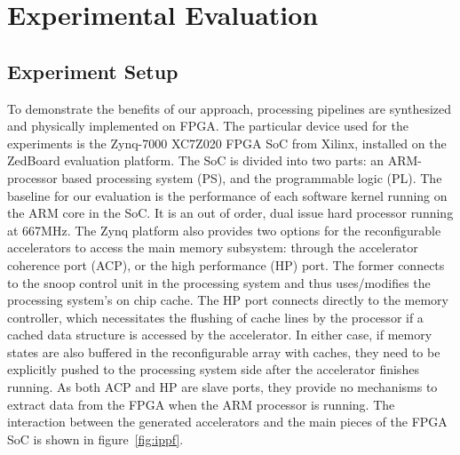 \section{Experimental Evaluation}
\label{sec:er}
\subsection{Experiment Setup }
To demonstrate the benefits of our approach, processing pipelines
are synthesized and physically implemented on FPGA. The particular device used for the experiments is the Zynq-7000 XC7Z020 FPGA
SoC from Xilinx, installed on the ZedBoard evaluation platform. 
The SoC is divided into two parts: an ARM-processor based processing system (PS), and the programmable logic (PL). 
The baseline 
for our evaluation is the performance of each software kernel running
on the ARM core in the SoC. It is an out of order, dual issue hard
processor running at 667MHz. The Zynq platform also provides two
options for the reconfigurable accelerators to access the main memory subsystem: 
through the accelerator coherence port (ACP), or the high performance (HP) port. 
The former connects to the snoop control unit in the processing system and 
thus uses/modifies the processing system's on chip cache. The HP port connects
directly to the memory controller, which necessitates the flushing of cache lines 
by the processor if a cached data structure is accessed by the accelerator.
In either case, if memory states are also buffered in the reconfigurable array with caches, they 
need to be explicitly pushed to the processing system side after the accelerator finishes running. As both ACP
and HP are slave ports, they provide no mechanisms to extract data from the FPGA
when the ARM processor is running. The interaction between the generated accelerators
and the main pieces of the FPGA SoC is shown in figure~\ref{fig:ippf}.



